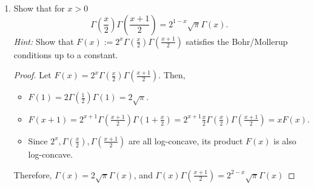 \documentclass{article}
\begin{document}
\begin{enumerate}[font = \Large\bfseries\itshape\space, leftmargin = 3mm, labelsep = 3mm]
\begin{proof}
\begin{enumerate}[label=(\roman*)]
\item For fixed $y > 0$ it holds:
\begin{itemize}
\item $B(1,y) = \frac{1}{y}$\\
$B(1,y) = \int_0^1 (1-t)^{y-1}dt = \frac{1}{y}$
\item $x \mapsto B(x,y)$ is log-convex on $\mathbb{R}^{++}$\\
For fixed $y$ and $p,q$ such that $\frac{1}{p} + \frac{1}{q} = 1$, let $f_p(x) = t^{(x-1)/p}(1-t)^{(y-1)/p}, f_q(x) = t^{(x-1)/q}(1-t)^{(y-1)/q}$.
Then, $B(x_1/p + x_2/q,y) = \|f_p f_q\|_1 \leq \|f_p\|_p\|f_q\|_q$ by H\"older's inequality.
\item $B$ satisfies the following function equation
$$xB(x,y) = (x+y)B(x+1,y)$$
\end{itemize}
Since $1 = t + (1-t)$, $B(x,y) = B(x+1,y) + B(x,y+1)$.
Thus, it suffices to show that $xB(x+1,y) = yB(x,y+1)$.
Let $t = \sin^2\theta$ and $\sin^x\theta = \sin^\phi$. Then,
$dt = 2\sin\theta\cos\theta d\theta$ and $x\sin^{x-1}\theta \cos\theta d\theta = y\sin^{y-1}\phi \cos\phi d\phi$,
$$
\begin{aligned}
xB(x+1,y) &= x\int_0^1 t^x(1-t)^{y-1}dt\\
&= x\int_0^{\pi/2} \sin^{2x+1}\theta \cos^{2y-1}\theta d\theta\\
&= y\int_0^{\pi/2} \sin^{2y+1}\phi \cos^{2x-1}\phi d\phi\\
&= yB(x,y+1)
\end{aligned}
$$
Let $F(x) = B(x,y) \frac{\Gamma(x+y)}{\Gamma(y)}$.
Then, $F$ satisfies Bohr/Mollerup conditions, hence $F(x) = \Gamma(x)$.
\end{enumerate}
\end{proof}

\item
Show that for $x > 0$
$$\Gamma(\frac{x}{2})\Gamma(\frac{x+1}{2}) = 2^{1-x}\sqrt{\pi}\Gamma(x).$$
\textit{Hint:} Show that $F(x) := 2^x \Gamma(\frac{x}{2})\Gamma(\frac{x+1}{2})$ satisfies the Bohr/Mollerup conditions up to a constant.
\begin{proof}
Let $F(x) = 2^x \Gamma(\frac{x}{2})\Gamma(\frac{x+1}{2})$. Then,
\begin{itemize}
\item
$F(1) = 2\Gamma(\frac{1}{2})\Gamma(1) = 2\sqrt{\pi}$.
\item
$F(x+1) = 2^{x+1} \Gamma(\frac{x+1}{2})\Gamma(1+\frac{x}{2}) = 2^{x+1} \frac{x}{2}\Gamma(\frac{x}{2})\Gamma(\frac{x+1}{2}) = xF(x).$
\item
Since $2^x, \Gamma(\frac{x}{2}), \Gamma(\frac{x+1}{2})$ are all log-concave, its product $F(x)$ is also log-concave.
\end{itemize}
Therefore, $\Gamma(x) = 2\sqrt{\pi} \Gamma(x)$, and $\Gamma(x)\Gamma(\frac{x+1}{2}) = 2^{2-x}\sqrt{\pi}\Gamma(x)$
\end{proof}


\end{enumerate}
\end{document}
